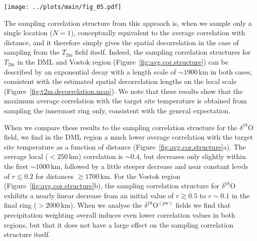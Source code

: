 \documentclass[draft]{agujournal2019}
\begin{document}
\begin{figure*}[t]%
\centering
\texttt{[image: ../plots/main/fig\_05.pdf]}
\caption{%
  Sampling correlation structures with temperature for the DML and Vostok
  regions in the case of sampling single locations. Shown is the average
  correlation as a function of distance between the interannual near-surface
  temperature ($T_{2\mathrm{m}}$) at a target site and the spatial fields of
  $T_{2\mathrm{m}}$ (black), oxygen isotope composition
  ($\delta^{18}\mathrm{O}$, green) and precipitation-weighted oxygen isotope
  composition ($\delta^{18}\mathrm{O}^{\mathrm{(pw)}}$, blue). Averaging was
  performed in two steps: first, correlations were averaged across grid cells
  falling within $250$\,km wide consecutive rings around a given target site,
  and secondly, the results were averaged across all respective target sites in
  the DML (a) and Vostok (b) region (see Methods). The black dashed lines
  indicate an exponential fit to the $T_{2\mathrm{m}}$ data.}
\label{fig:avg.cor.structure}%
\end{figure*}%

The sampling correlation structure from this approach is, when we sample only a
single location ($N=1$), conceptually equivalent to the average correlation with
distance, and it therefore simply gives the spatial decorrelation in the case of
sampling from the $T_{\mathrm{2m}}$ field itself. Indeed, the sampling
correlation structures for $T_{\mathrm{2m}}$ in the DML and Vostok region
(Figure~\ref{fig:avg.cor.structure}) can be described by an exponential decay with
a length scale of $\sim1900$\,km in both cases, consistent with the estimated
spatial decorrelation lengths on the local scale
(Figure~\ref{fig:t2m.decorrelation.map}). We note that these results show that
the maximum average correlation with the target site temperature is obtained
from sampling the innermost ring only, consistent with the general expectation.

When we compare these results to the sampling correlation structure for the
$\delta^{18}\mathrm{O}$ field, we find in the DML region a much lower average
correlation with the target site temperature as a function of distance
(Figure~\ref{fig:avg.cor.structure}a). The average local ($<250$\,km) correlation
is $\sim0.4$, but decreases only slightly within the first $\sim1000$\,km,
followed by a little steeper decrease and near constant levels of $r\lesssim0.2$
for distances $\gtrsim1700$\,km. For the Vostok region
(Figure~\ref{fig:avg.cor.structure}b), the sampling correlation structure for
$\delta^{18}\mathrm{O}$ exhibits a nearly linear decrease from an initial value
of $r\gtrsim0.5$ to $r\sim0.1$ in the final ring ($>2000$\,km). When we analyse
the $\delta^{18}\mathrm{O}^{\mathrm{(pw)}}$ fields we find that precipitation
weighting overall induces even lower correlation values in both regions, but
that it does not have a large effect on the sampling correlation structure
itself.
\end{document}
